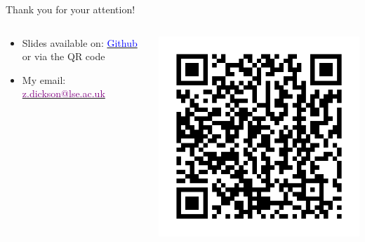\documentclass[10pt,aspectratio=169]{beamer}
\begin{document}
\begin{frame}{Thank you for your attention!}

\bigskip 

\begin{columns}[onlytextwidth]
    \begin{column}{0.6\textwidth}

\begin{itemize}
    \item Slides available on: \href{https://github.com/z-dickson/POAL-ML-and-public-opinion}{\textcolor{blue}{Github}} or via the QR code
    \item My email: \href{mailto:z.dickson@lse.ac.uk}{\textcolor{purple}{z.dickson@lse.ac.uk}}
\end{itemize}

\end{column}
\begin{column}{0.4\textwidth}

\includegraphics[width=.8\textwidth]{figures/qr_code.png}

\end{column}
\end{columns}
\end{frame}




\end{document}
